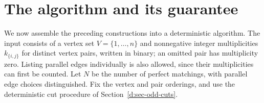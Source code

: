 \section{The algorithm and its guarantee}
\label{d:sec-algorithm}

We now assemble the preceding constructions into a deterministic algorithm.
The input consists of a vertex set \(V=\{1,\ldots,n\}\) and nonnegative
integer multiplicities \(k_{\{i,j\}}\) for distinct vertex pairs, written in
binary; an omitted pair has multiplicity zero.  Listing parallel edges
individually is also allowed, since their multiplicities can first be
counted.  Let \(N\) be the number of perfect matchings, with parallel
edge choices distinguished.  Fix the vertex and pair orderings, and use
the deterministic cut procedure of Section~\ref{d:sec-odd-cuts}.

